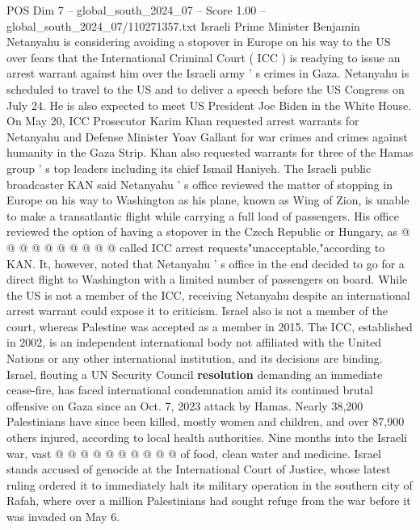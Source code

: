 \begin{textsample}{POS Dim 7 – global\_south\_2024\_07 – Score 1.00 – global\_south\_2024\_07/110271357.txt}  \label{ex:f7_pos_116}
Israeli Prime Minister Benjamin Netanyahu is considering avoiding a stopover in Europe on his way to the US over fears that the International Criminal Court ( ICC ) is readying to issue an arrest warrant against him over the Israeli army ' s crimes in Gaza.
Netanyahu is scheduled to travel to the US and to deliver a speech before the US Congress on July 24.
He is also expected to meet US President Joe Biden in the White House.
On May 20, ICC Prosecutor Karim Khan requested arrest warrants for Netanyahu and Defense Minister Yoav Gallant for war crimes and crimes against humanity in the Gaza Strip.
Khan also requested warrants for three of the Hamas group ' s top leaders including its chief Ismail Haniyeh.
The Israeli public broadcaster KAN said Netanyahu ' s office reviewed the matter of stopping in Europe on his way to Washington as his plane, known as Wing of Zion, is unable to make a transatlantic flight while carrying a full load of passengers.
His office reviewed the option of having a stopover in the Czech Republic or Hungary, as @ @ @ @ @ @ @ @ @ @ called ICC arrest requests"unacceptable,"according to KAN.
It, however, noted that Netanyahu ' s office in the end decided to go for a direct flight to Washington with a limited number of passengers on board.
While the US is not a member of the ICC, receiving Netanyahu despite an international arrest warrant could expose it to criticism.
Israel also is not a member of the court, whereas Palestine was accepted as a member in 2015.
The ICC, established in 2002, is an independent international body not affiliated with the United Nations or any other international institution, and its decisions are binding.
Israel, flouting a UN Security Council \textbf{resolution} demanding an immediate cease-fire, has faced international condemnation amid its continued brutal offensive on Gaza since an Oct. 7, 2023 attack by Hamas.
Nearly 38,200 Palestinians have since been killed, mostly women and children, and over 87,900 others injured, according to local health authorities.
Nine months into the Israeli war, vast @ @ @ @ @ @ @ @ @ @ of food, clean water and medicine.
Israel stands accused of genocide at the International Court of Justice, whose latest ruling ordered it to immediately halt its military operation in the southern city of Rafah, where over a million Palestinians had sought refuge from the war before it was invaded on May 6.

\end{textsample}
